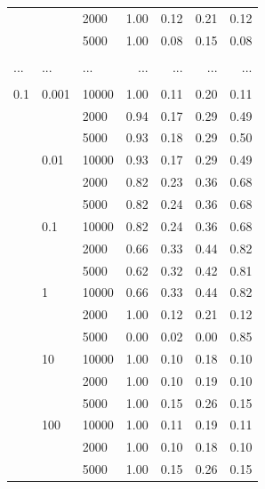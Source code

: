 \documentclass[a4paper,10pt]{article}
\begin{document}
\begin{table}[!ht]
\begin{multicols}{2}
\begin{scriptsize}
\begin{tabular}{|lllrrrr|}
      &       & 2000 &       1.00 &       0.12 &       0.21 &       0.12 \\
      &       & 5000 &       1.00 &       0.08 &       0.15 &       0.08 \\
      & 	  &		 &            &            &            &            \\
 ...  &  ...  & ...  &   ...      &   ...      &   ...      &   ...      \\
      & 	  &		 &            &            &            &            \\
0.1 & 0.001 & 10000 &       1.00 &       0.11 &       0.20 &       0.11 \\
      &       & 2000 &       0.94 &       0.17 &       0.29 &       0.49 \\
      &       & 5000 &       0.93 &       0.18 &       0.29 &       0.50 \\
      & 0.01 & 10000 &       0.93 &       0.17 &       0.29 &       0.49 \\
      &       & 2000 &       0.82 &       0.23 &       0.36 &       0.68 \\
      &       & 5000 &       0.82 &       0.24 &       0.36 &       0.68 \\
      & 0.1 & 10000 &       0.82 &       0.24 &       0.36 &       0.68 \\
      &       & 2000 &       0.66 &       0.33 &       0.44 &       0.82 \\
      &       & 5000 &       0.62 &       0.32 &       0.42 &       0.81 \\
      & 1 & 10000 &       0.66 &       0.33 &       0.44 &       0.82 \\
      &       & 2000 &       1.00 &       0.12 &       0.21 &       0.12 \\
      &       & 5000 &       0.00 &       0.02 &       0.00 &       0.85 \\
      & 10 & 10000 &       1.00 &       0.10 &       0.18 &       0.10 \\
      &       & 2000 &       1.00 &       0.10 &       0.19 &       0.10 \\
      &       & 5000 &       1.00 &       0.15 &       0.26 &       0.15 \\
      & 100 & 10000 &       1.00 &       0.11 &       0.19 &       0.11 \\
      &       & 2000 &       1.00 &       0.10 &       0.18 &       0.10 \\
      &       & 5000 &       1.00 &       0.15 &       0.26 &       0.15 \\

\end{tabular}
\end{scriptsize}
\end{multicols}
\end{table}
\end{document}
